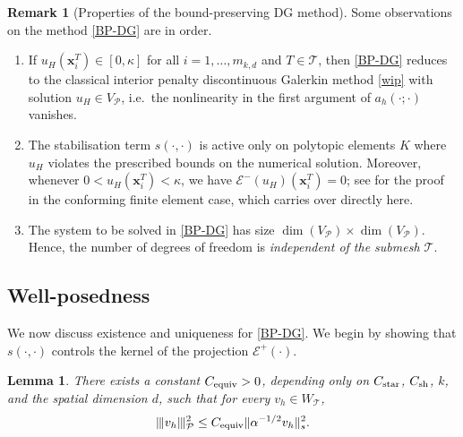 \documentclass[11pt,final]{amsart}
\theoremstyle{plain}
\newtheorem{lemma}[theorem]{Lemma}
\theoremstyle{definition}
\newtheorem{Remark}[theorem]{Remark}
\newcommand\bx{\boldsymbol{x}}
\newcommand\calP{{\mathcal{P}}}
\newcommand\calT{{\mathcal{T}}}
\newcommand{\mesh}{\calP}
\newcommand{\ndgp}[1]{| \kern -.25mm \|{#1}| \kern -.25mm \|_{\rm \mesh}}
\begin{document}
\begin{Remark}[Properties of the bound-preserving DG method]
Some observations on the method \eqref{BP-DG} are in order.
\begin{enumerate}
\item If $u_{H}(\bx_i^T)\in[0,\kappa]$ for all $i=1,\dots,m_{k,d}$ and
  $T\in\calT$, then \eqref{BP-DG} reduces to the classical interior
  penalty discontinuous Galerkin method \eqref{wip} with solution
  $u_H\in V_\calP$, i.e.\ the nonlinearity in the first argument of
  $a_h(\cdot;\cdot)$ vanishes.
\item The stabilisation term $s(\cdot,\cdot)$ is active only on
  polytopic elements $K$ where $u_H$ violates the prescribed bounds on
  the numerical solution. Moreover, whenever
  $0<u_{H}(\bx_i^T)<\kappa$, we have
  $\mathcal{E}^{-}(u_{H})(\bx_i^T)=0$; see \cite[Remark~3.2]{ABP24}
  for the proof in the conforming finite element case, which carries
  over directly here.
\item The system to be solved in \eqref{BP-DG} has size
  $\dim(V_\mesh)\times \dim(V_\mesh)$. Hence, the number of degrees of
  freedom is \emph{independent of the submesh $\calT$}.
\end{enumerate}
\end{Remark}

\subsection{Well-posedness}
We now discuss existence and uniqueness for \eqref{BP-DG}. We begin by
showing that $s(\cdot,\cdot)$ controls the kernel of the projection
$\mathcal{E}^+(\cdot)$.

\begin{lemma}
  \label{Lem:s}
There exists a constant $C_{\rm equiv}>0$, depending only on
$C_{\rm star}$, $C_{\rm sh}$, $k$, and the spatial dimension $d$, such
that for every $v_h\in W_\calT$,
\begin{align}
  \ndgp{ v_{h}}^{2}
   \le  C_{\rm equiv} \|\alpha^{-1/2} v_h \|_{s}^{2}.  \label{eq22}
\end{align}
\end{lemma}
\end{document}
